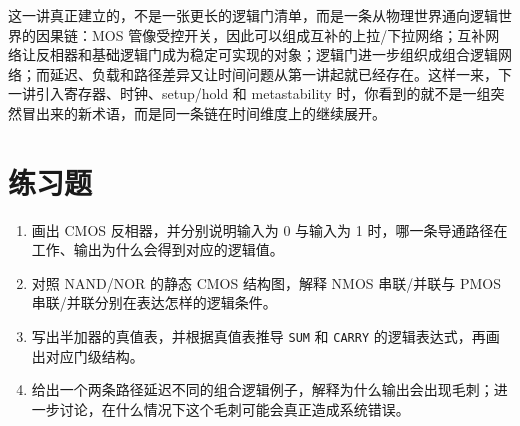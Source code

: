 \documentclass[11pt,a4paper]{article}
\begin{document}
这一讲真正建立的，不是一张更长的逻辑门清单，而是一条从物理世界通向逻辑世界的因果链：MOS 管像受控开关，因此可以组成互补的上拉/下拉网络；互补网络让反相器和基础逻辑门成为稳定可实现的对象；逻辑门进一步组织成组合逻辑网络；而延迟、负载和路径差异又让时间问题从第一讲起就已经存在。这样一来，下一讲引入寄存器、时钟、setup/hold 和 metastability 时，你看到的就不是一组突然冒出来的新术语，而是同一条链在时间维度上的继续展开。

\section{练习题}

\begin{enumerate}
  \item 画出 CMOS 反相器，并分别说明输入为 0 与输入为 1 时，哪一条导通路径在工作、输出为什么会得到对应的逻辑值。
  \item 对照 NAND/NOR 的静态 CMOS 结构图，解释 NMOS 串联/并联与 PMOS 串联/并联分别在表达怎样的逻辑条件。
  \item 写出半加器的真值表，并根据真值表推导 \texttt{SUM} 和 \texttt{CARRY} 的逻辑表达式，再画出对应门级结构。
  \item 给出一个两条路径延迟不同的组合逻辑例子，解释为什么输出会出现毛刺；进一步讨论，在什么情况下这个毛刺可能会真正造成系统错误。
\end{enumerate}
\end{document}

